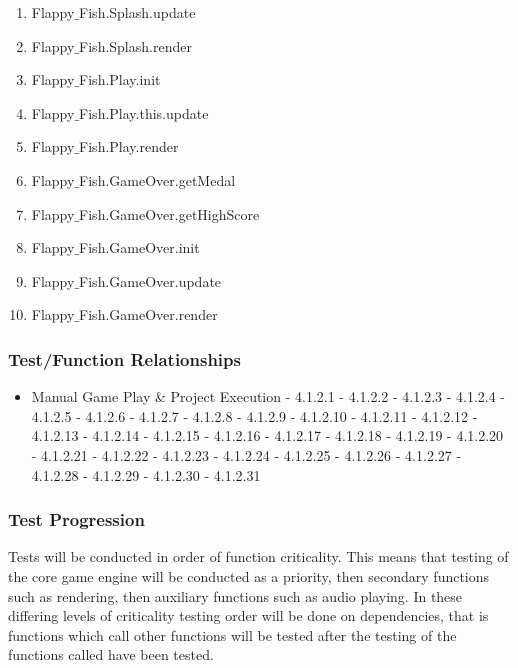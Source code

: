 \documentclass[11pt, oneside]{article}   	%
\begin{document}
\begin{enumerate}
\item Flappy$\_$Fish.Splash.update

\item Flappy$\_$Fish.Splash.render

\item Flappy$\_$Fish.Play.init

\item Flappy$\_$Fish.Play.this.update

\item Flappy$\_$Fish.Play.render

\item Flappy$\_$Fish.GameOver.getMedal

\item Flappy$\_$Fish.GameOver.getHighScore

\item Flappy$\_$Fish.GameOver.init

\item Flappy$\_$Fish.GameOver.update

\item Flappy$\_$Fish.GameOver.render

\end{enumerate}

\subsubsection{Test/Function Relationships}
\begin{itemize}
\item Manual Game Play \& Project Execution
\subitem - 4.1.2.1
\subitem - 4.1.2.2
\subitem - 4.1.2.3
\subitem - 4.1.2.4
\subitem - 4.1.2.5
\subitem - 4.1.2.6
\subitem - 4.1.2.7
\subitem - 4.1.2.8
\subitem - 4.1.2.9
\subitem - 4.1.2.10
\subitem - 4.1.2.11
\subitem - 4.1.2.12
\subitem - 4.1.2.13
\subitem - 4.1.2.14
\subitem - 4.1.2.15
\subitem - 4.1.2.16
\subitem - 4.1.2.17
\subitem - 4.1.2.18
\subitem - 4.1.2.19
\subitem - 4.1.2.20
\subitem - 4.1.2.21
\subitem - 4.1.2.22
\subitem - 4.1.2.23
\subitem - 4.1.2.24
\subitem - 4.1.2.25
\subitem - 4.1.2.26
\subitem - 4.1.2.27
\subitem - 4.1.2.28
\subitem - 4.1.2.29
\subitem - 4.1.2.30
\subitem - 4.1.2.31
\end{itemize}

\subsubsection{Test Progression}
Tests will be conducted in order of function criticality. This means that testing of the core game engine will be conducted as a priority, then secondary functions such as rendering, then auxiliary functions such as audio playing. In these differing levels of criticality testing order will be done on dependencies, that is functions which call other functions will be tested after the testing of the functions called have been tested.
\end{document}

